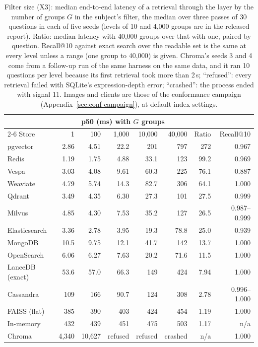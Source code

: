 \begin{table}[tbp]
\centering
\small
\begin{tabular}{@{}lrrrrrrr@{}}
\toprule
 & \multicolumn{5}{c}{p50 (ms) with $G$ groups} & & \\
\cmidrule(lr){2-6}
Store & 1 & 100 & 1,000 & 10,000 & 40,000 & Ratio & Recall@10 \\
\midrule
pgvector & 2.86 & 4.51 & 22.2 & 201 & 797 & 272 & 0.967 \\
Redis & 1.19 & 1.75 & 4.88 & 33.1 & 123 & 99.2 & 0.969 \\
Vespa & 3.03 & 4.08 & 9.61 & 60.3 & 225 & 76.1 & 0.887 \\
Weaviate & 4.79 & 5.74 & 14.3 & 82.7 & 306 & 64.1 & 1.000 \\
Qdrant & 3.49 & 4.35 & 6.30 & 27.3 & 101 & 27.5 & 0.999 \\
Milvus & 4.85 & 4.30 & 7.53 & 35.2 & 127 & 26.5 & 0.987--0.999 \\
Elasticsearch & 3.36 & 2.78 & 3.95 & 19.3 & 78.8 & 25.0 & 0.939 \\
MongoDB & 10.5 & 9.75 & 12.1 & 41.7 & 142 & 13.7 & 1.000 \\
OpenSearch & 6.06 & 6.27 & 7.63 & 20.2 & 71.6 & 11.5 & 1.000 \\
LanceDB (exact) & 53.6 & 57.0 & 66.3 & 149 & 424 & 7.94 & 1.000 \\
Cassandra & 109 & 166 & 90.7 & 124 & 308 & 2.78 & 0.996--1.000 \\
FAISS (flat) & 385 & 390 & 403 & 424 & 454 & 1.19 & 1.000 \\
In-memory & 432 & 439 & 451 & 475 & 503 & 1.17 & n/a \\
Chroma & 4,340 & 10,627 & refused & refused & crashed & n/a & 1.000 \\
\bottomrule
\end{tabular}
\caption{Filter size (X3): median end-to-end latency of a retrieval through the layer by the number of
groups $G$ in the subject's filter, the median over three passes of 30 questions in each of five
seeds (levels of 10 and 4,000 groups are in the released report). Ratio: median latency with 40,000
groups over that with one, paired by question. Recall@10 against exact search over the readable set
is the same at every level unless a range (one group to 40,000) is given. Chroma's seeds 3 and 4 come
from a follow-up run of the same harness on the same data, and it ran 10 questions per level because
its first retrieval took more than 2\,s; ``refused'':
every retrieval failed with SQLite's expression-depth error; ``crashed'': the process ended with
signal 11. Images and clients are those of the conformance campaign
(Appendix~\ref{sec:conf-campaign}), at default index settings.}
\label{tab:qual-size}
\end{table}

